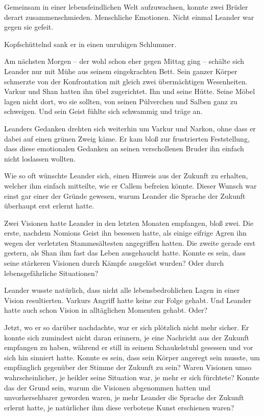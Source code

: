 \documentclass[10pt, a4paper, oneside]{book}
\begin{document}
Gemeinsam in einer lebensfeindlichen Welt aufzuwachsen, konnte zwei Brüder derart zusammenschmieden. Menschliche Emotionen. Nicht einmal Leander war gegen sie gefeit.

Kopfschüttelnd sank er in einen unruhigen Schlummer.\bigskip







Am nächsten Morgen – der wohl schon eher gegen Mittag ging – schälte sich Leander nur mit Mühe aus seinem eingekrachten Bett. Sein ganzer Körper schmerzte von der Konfrontation mit gleich zwei übermächtigen Wesenheiten. Varkur und Shan hatten ihn übel zugerichtet. Ihn und seine Hütte. Seine Möbel lagen nicht dort, wo sie sollten, von seinen Pülverchen und Salben ganz zu schweigen. Und sein Geist fühlte sich schwammig und träge an.

Leanders Gedanken drehten sich weiterhin um Varkur und Narkon, ohne dass er dabei auf einen grünen Zweig käme. Er kam bloß zur frustrierten Feststellung, dass diese emotionalen Gedanken an seinen verschollenen Bruder ihn einfach nicht loslassen wollten.

Wie so oft wünschte Leander sich, einen Hinweis aus der Zukunft zu erhalten, welcher ihm einfach mitteilte, wie er Callem befreien könnte. Dieser Wunsch war einst gar einer der Gründe gewesen, warum Leander die Sprache der Zukunft überhaupt erst erlernt hatte.

Zwei Visionen hatte Leander in den letzten Monaten empfangen, bloß zwei. Die erste, nachdem Nomions Geist ihn besessen hatte, als einige eifrige Agren ihn wegen der verletzten Stammesältesten angegriffen hatten. Die zweite gerade erst gestern, als Shan ihm fast das Leben ausgehaucht hatte. Konnte es sein, dass seine stärkeren Visionen durch Kämpfe ausgelöst wurden? Oder durch lebensgefährliche Situationen?

Leander wusste natürlich, dass nicht alle lebensbedrohlichen Lagen in einer Vision resultierten. Varkurs Angriff hatte keine zur Folge gehabt. Und Leander hatte auch schon Vision in alltäglichen Momenten gehabt. Oder?

Jetzt, wo er so darüber nachdachte, war er sich plötzlich nicht mehr sicher. Er konnte sich zumindest nicht daran erinnern, je eine Nachricht aus der Zukunft empfangen zu haben, während er still in seinem Schaukelstuhl gesessen und vor sich hin sinniert hatte. Konnte es sein, dass sein Körper angeregt sein musste, um empfänglich gegenüber der Stimme der Zukunft zu sein? Waren Visionen umso wahrscheinlicher, je heikler seine Situation war, je mehr er sich fürchtete? Konnte das der Grund sein, warum die Visionen abgenommen hatten und unvorhersehbarer geworden waren, je mehr Leander die Sprache der Zukunft erlernt hatte, je natürlicher ihm diese verbotene Kunst erschienen waren?
\end{document}
